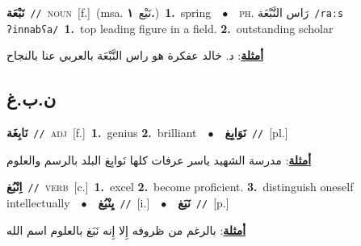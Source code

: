 \documentclass[10pt,a4paper,twoside]{article} %
\begin{document}
\begin{multicols}{2}
{{{{{{\setlength\topsep{0pt}\textbf{\foreignlanguage{arabic}{نَبْعَة}}\ {\color{gray}\texttt{//}\color{black}}\ \textsc{noun}\ [f.]\ \color{gray}(msa. \foreignlanguage{arabic}{نَبْع}~\foreignlanguage{arabic}{\textbf{١.}})\color{black}\ \textbf{1.}~spring\ \ $\bullet$\ \ \textsc{ph.} \color{gray} \foreignlanguage{arabic}{رَاس النَّبْعَة}\color{black}\ {\color{gray}\texttt{/{\sffamily raːs ʔinnabʕa}/}\color{black}}\ \textbf{1.}~top leading figure in a field.  \textbf{2.}~outstanding scholar\  \begin{flushright}\color{gray}\foreignlanguage{arabic}{\textbf{\underline{\foreignlanguage{arabic}{أمثلة}}}: د. خالد عفكرة هو راس النَّبْعَة بالعربي عنا بالنجاح}\end{flushright}\color{black}} \vspace{2mm}

\vspace{-3mm}
\subsection*{\color{blue}\foreignlanguage{arabic}{ن.ب.غ}\color{blue}{}} 

{\setlength\topsep{0pt}\textbf{\foreignlanguage{arabic}{نَابِغَة}}\ {\color{gray}\texttt{//}\color{black}}\ \textsc{adj}\ [f.]\ \textbf{1.}~genius  \textbf{2.}~brilliant\ \ $\bullet$\ \ \setlength\topsep{0pt}\textbf{\foreignlanguage{arabic}{نَوَابِغ}}\ {\color{gray}\texttt{//}\color{black}}\ [pl.]\  \begin{flushright}\color{gray}\foreignlanguage{arabic}{\textbf{\underline{\foreignlanguage{arabic}{أمثلة}}}: مدرسة الشهيد ياسر عرفات كلها نَوابِغ البلد بالرسم والعلوم}\end{flushright}\color{black}} \vspace{2mm}

{\setlength\topsep{0pt}\textbf{\foreignlanguage{arabic}{اِنْبُغ}}\ {\color{gray}\texttt{//}\color{black}}\ \textsc{verb}\ [c.]\ \textbf{1.}~excel  \textbf{2.}~become proficient.  \textbf{3.}~distinguish oneself intellectually\ \ $\bullet$\ \ \setlength\topsep{0pt}\textbf{\foreignlanguage{arabic}{يِنْبُغ}}\ {\color{gray}\texttt{//}\color{black}}\ [i.]\ \ $\bullet$\ \ \setlength\topsep{0pt}\textbf{\foreignlanguage{arabic}{نَبَغ}}\ {\color{gray}\texttt{//}\color{black}}\ [p.]\  \begin{flushright}\color{gray}\foreignlanguage{arabic}{\textbf{\underline{\foreignlanguage{arabic}{أمثلة}}}: بالرغم من ظروفه إِلا إِنه نَبَغ بالعلوم اسم الله}\end{flushright}\color{black}} \vspace{2mm}

}}}}}
\end{multicols}
\end{document}
